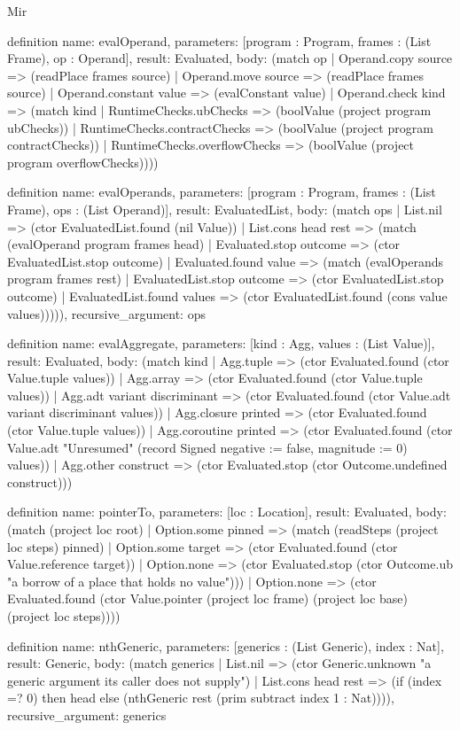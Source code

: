\begin{lexlean}{Mir}
\begin{semanticmodule}
definition{
  name: evalOperand,
  parameters: [program : Program, frames : (List Frame), op : Operand],
  result: Evaluated,
  body: (match op
    | Operand.copy source => (readPlace frames source)
    | Operand.move source => (readPlace frames source)
    | Operand.constant value => (evalConstant value)
    | Operand.check kind => (match kind
      | RuntimeChecks.ubChecks => (boolValue (project program ubChecks))
      | RuntimeChecks.contractChecks => (boolValue (project program contractChecks))
      | RuntimeChecks.overflowChecks => (boolValue (project program overflowChecks))))
}

definition{
  name: evalOperands,
  parameters: [program : Program, frames : (List Frame), ops : (List Operand)],
  result: EvaluatedList,
  body: (match ops
    | List.nil => (ctor EvaluatedList.found (nil Value))
    | List.cons head rest => (match (evalOperand program frames head)
      | Evaluated.stop outcome => (ctor EvaluatedList.stop outcome)
      | Evaluated.found value => (match (evalOperands program frames rest)
        | EvaluatedList.stop outcome => (ctor EvaluatedList.stop outcome)
        | EvaluatedList.found values => (ctor EvaluatedList.found (cons value values))))),
  recursive_argument: ops
}

definition{
  name: evalAggregate,
  parameters: [kind : Agg, values : (List Value)],
  result: Evaluated,
  body: (match kind
    | Agg.tuple => (ctor Evaluated.found (ctor Value.tuple values))
    | Agg.array => (ctor Evaluated.found (ctor Value.tuple values))
    | Agg.adt variant discriminant => (ctor Evaluated.found (ctor Value.adt variant discriminant values))
    | Agg.closure printed => (ctor Evaluated.found (ctor Value.tuple values))
    | Agg.coroutine printed => (ctor Evaluated.found (ctor Value.adt "Unresumed" (record Signed {negative := false, magnitude := 0}) values))
    | Agg.other construct => (ctor Evaluated.stop (ctor Outcome.undefined construct)))
}

definition{
  name: pointerTo,
  parameters: [loc : Location],
  result: Evaluated,
  body: (match (project loc root)
    | Option.some pinned => (match (readSteps (project loc steps) pinned)
      | Option.some target => (ctor Evaluated.found (ctor Value.reference target))
      | Option.none => (ctor Evaluated.stop (ctor Outcome.ub "a borrow of a place that holds no value")))
    | Option.none => (ctor Evaluated.found (ctor Value.pointer (project loc frame) (project loc base) (project loc steps))))
}

definition{
  name: nthGeneric,
  parameters: [generics : (List Generic), index : Nat],
  result: Generic,
  body: (match generics
    | List.nil => (ctor Generic.unknown "a generic argument its caller does not supply")
    | List.cons head rest => (if (index =? 0) then head else (nthGeneric rest (prim subtract index 1 : Nat)))),
  recursive_argument: generics
}


\end{semanticmodule}
\end{lexlean}
